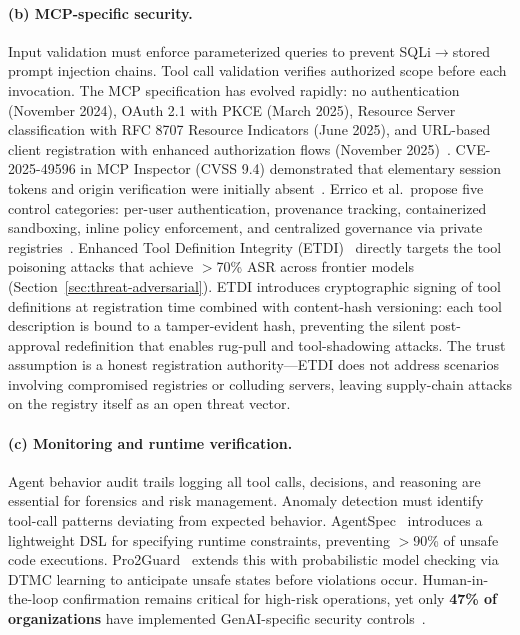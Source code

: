 \paragraph{(b) MCP-specific security.}
Input validation must enforce parameterized queries to prevent SQLi$\to$stored prompt injection chains. Tool call validation verifies authorized scope before each invocation. The MCP specification has evolved rapidly: no authentication (November 2024), OAuth 2.1 with PKCE (March 2025), Resource Server classification with RFC 8707 Resource Indicators (June 2025), and URL-based client registration with enhanced authorization flows (November 2025)~\cite{mcpspec2025}. CVE-2025-49596 in MCP Inspector (CVSS 9.4) demonstrated that elementary session tokens and origin verification were initially absent~\cite{oligo2025inspector}. Errico et al.\ propose five control categories: per-user authentication, provenance tracking, containerized sandboxing, inline policy enforcement, and centralized governance via private registries~\cite{errico2025mcpsecurity}. Enhanced Tool Definition Integrity (ETDI)~\cite{bhatt2025etdi} directly targets the tool poisoning attacks that achieve $>$70\% ASR across frontier models (Section~\ref{sec:threat-adversarial}). ETDI introduces cryptographic signing of tool definitions at registration time combined with content-hash versioning: each tool description is bound to a tamper-evident hash, preventing the silent post-approval redefinition that enables rug-pull and tool-shadowing attacks. The trust assumption is a honest registration authority---ETDI does not address scenarios involving compromised registries or colluding servers, leaving supply-chain attacks on the registry itself as an open threat vector.

\paragraph{(c) Monitoring and runtime verification.}
Agent behavior audit trails logging all tool calls, decisions, and reasoning are essential for forensics and risk management. Anomaly detection must identify tool-call patterns deviating from expected behavior. AgentSpec~\cite{wang2025agentspec} introduces a lightweight DSL for specifying runtime constraints, preventing $>$90\% of unsafe code executions. Pro2Guard~\cite{pro2guard2025} extends this with probabilistic model checking via DTMC learning to anticipate unsafe states before violations occur. Human-in-the-loop confirmation remains critical for high-risk operations, yet only \textbf{47\% of organizations} have implemented GenAI-specific security controls~\cite{microsoft2026cyberpulse}.

